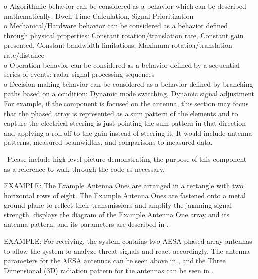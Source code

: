 {{o	\unclass Algorithmic behavior can be considered as a behavior which can be described mathematically: Dwell Time Calculation,
Signal Prioritization\\
o	\unclass Mechanical/Hardware behavior can be considered as a behavior defined through physical properties: Constant rotation/translation rate, Constant gain presented, Constant bandwidth limitations, Maximum rotation/translation rate/distance\\
o	\unclass Operation behavior can be considered as a behavior defined by a sequential series of events: radar signal processing sequences\\
o	\unclass Decision-making behavior can be considered as a behavior defined by branching paths based on a condition: 	Dynamic mode switching,	Dynamic signal adjustment\\

\unclass For example, if the component is focused on the antenna, this section may focus that the phased array is represented as a sum pattern of the elements and to capture the electrical steering is just pointing the sum pattern in that direction and applying a roll-off to the gain instead of steering it. It would include antenna patterns, measured beamwidths, and comparisons to measured data. 

\unclass\ Please include high-level picture demonstrating the purpose of this component as a reference to walk through the code as necessary.

\unclass EXAMPLE: The Example Antenna Ones are arranged in a rectangle with two horizontal rows of eight. The Example
Antenna Ones are fastened onto a metal ground plane to reflect their transmissions and amplify the jamming
signal strength.  displays the diagram of the Example Antenna One array and its antenna pattern, and
its parameters are described in .

\unclass EXAMPLE: For receiving, the system contains two AESA phased array antennas
to allow the system to analyze threat signals and react accordingly. The antenna parameters for the AESA
antennas can be seen above in , and the Three Dimensional (3D) radiation pattern for the antennas can
be seen in .
} %





}
